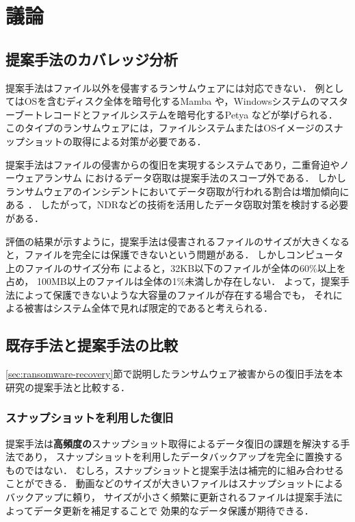 \chapter{議論}
\section{提案手法のカバレッジ分析}
提案手法はファイル以外を侵害するランサムウェアには対応できない．
例としてはOSを含むディスク全体を暗号化するMamba \cite{mamba-petya} や，Windowsシステムのマスターブートレコードとファイルシステムを暗号化するPetya \cite{mamba-petya} などが挙げられる．
このタイプのランサムウェアには，ファイルシステムまたはOSイメージのスナップショットの取得による対策が必要である．

提案手法はファイルの侵害からの復旧を実現するシステムであり，二重脅迫やノーウェアランサム \cite{nowhere-ransom} におけるデータ窃取は提案手法のスコープ外である．
しかしランサムウェアのインシデントにおいてデータ窃取が行われる割合は増加傾向にある \cite{sophos-report:online}．
したがって，NDRなどの技術を活用したデータ窃取対策を検討する必要がある．

評価の結果が示すように，提案手法は侵害されるファイルのサイズが大きくなると，ファイルを完全には保護できないという問題がある．
しかしコンピュータ上のファイルのサイズ分布 \cite{file-size-dist} によると，32KB以下のファイルが全体の60\%以上を占め，
100MB以上のファイルは全体の1\%未満しか存在しない．
よって，提案手法によって保護できないような大容量のファイルが存在する場合でも，
それによる被害はシステム全体で見れば限定的であると考えられる．


\section{既存手法と提案手法の比較}
\ref{sec:ransomware-recovery}節で説明したランサムウェア被害からの復旧手法を本研究の提案手法と比較する．
\subsection{スナップショットを利用した復旧}
提案手法は\textbf{高頻度の}スナップショット取得によるデータ復旧の課題を解決する手法であり，
スナップショットを利用したデータバックアップを完全に置換するものではない．
むしろ，スナップショットと提案手法は補完的に組み合わせることができる．
動画などのサイズが大きいファイルはスナップショットによるバックアップに頼り，
サイズが小さく頻繁に更新されるファイルは提案手法によってデータ更新を補足することで
効果的なデータ保護が期待できる．

